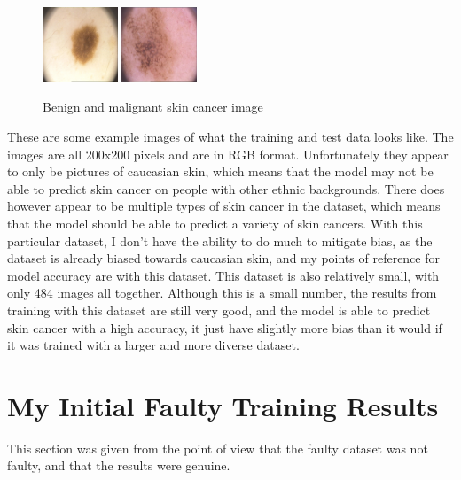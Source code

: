 \documentclass[]{final_report}
\begin{document}
\begin{figure}[h]
  \centering
  \includegraphics[width=0.2\textwidth]{images/benign-skin-cancer.png}
  \includegraphics[width=0.2\textwidth]{images/malignant-skin-cancer.png}
  \caption{Benign and malignant skin cancer image}
  \label{fig:benign-malignant}
\end{figure}

These are some example images of what the training and test data looks like. The images are all 200x200 pixels and are in RGB format.
Unfortunately they appear to only be pictures of caucasian skin, which means that the model may not be able to predict skin cancer on people with other ethnic backgrounds.
There does however appear to be multiple types of skin cancer in the dataset, which means that the model should be able to predict a variety of skin cancers.
With this particular dataset, I don't have the ability to do much to mitigate bias, as the dataset is already biased towards caucasian skin, and my points of reference for model accuracy are with this dataset.
This dataset is also relatively small, with only 484 images all together. Although this is a small number, the results from training with this dataset are still very good, and the model is able to predict skin cancer with a high accuracy, it just have slightly more bias than it would if it was trained with a larger and more diverse dataset.

\chapter{My Initial Faulty Training Results}

This section was given from the point of view that the faulty dataset was not faulty, and that the results were genuine.
\end{document}
